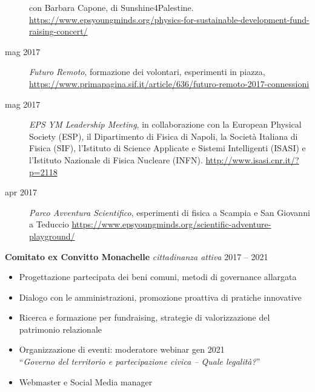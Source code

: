 \documentclass[a4paper]{article}
\begin{document}
\begin{addmargin}[1.5em]{0em}
\begin{description}
          con Barbara Capone, di Sunshine4Palestine.
          \url{https://www.epsyoungminds.org/physics-for-sustainable-development-fund-raising-concert/}
    \item [mag 2017] \emph{Futuro Remoto},
          formazione dei volontari, esperimenti in piazza,
          \url{https://www.primapagina.sif.it/article/636/futuro-remoto-2017-connessioni}
    \item[mag 2017] \emph{EPS YM Leadership Meeting},
          in collaborazione con la European Physical Society (ESP),
          il Dipartimento di Fisica di Napoli,
          la Società Italiana di Fisica (SIF),
          l’Istituto di Science Applicate e Sistemi Intelligenti (ISASI)
          e l’Istituto Nazionale di Fisica Nucleare (INFN).
          \url{http://www.isasi.cnr.it/?p=2118}
    \item [apr 2017] \emph{Parco Avventura Scientifico},
          esperimenti di fisica a Scampia e San Giovanni a Teduccio
          \url{https://www.epsyoungminds.org/scientific-adventure-playground/}
  \end{description}
\end{addmargin}

\vspace*{2mm}
\textbf{Comitato ex Convitto Monachelle}
{\sl cittadinanza attiva} \hfill 2017 -- 2021\\
\begin{itemize} \itemsep 1pt
  \item Progettazione partecipata dei beni comuni, metodi di governance
        allargata
  \item Dialogo con le amministrazioni, promozione proattiva di pratiche
        innovative
  \item Ricerca e formazione per fundraising, strategie di valorizzazione del
        patrimonio relazionale
  \item Organizzazione di eventi:
  moderatore webinar gen 2021 \\
        ``\textit{Governo del territorio e partecipazione civica – Quale
        legalità?}''
  \item Webmaster e Social Media manager
\end{itemize}
\end{document}
